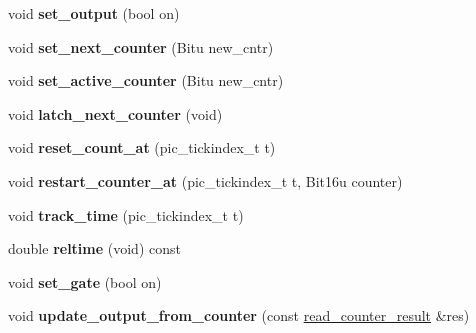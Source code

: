 \begin{DoxyCompactItemize}
\item 
\hypertarget{structPIT__Block_a9ea05717862ad509b30c01e97efc1d6e}{void {\bfseries set\-\_\-output} (bool on)}\label{structPIT__Block_a9ea05717862ad509b30c01e97efc1d6e}

\item 
\hypertarget{structPIT__Block_a4ec9e0b2471d1fe95086780f62f8031c}{void {\bfseries set\-\_\-next\-\_\-counter} (Bitu new\-\_\-cntr)}\label{structPIT__Block_a4ec9e0b2471d1fe95086780f62f8031c}

\item 
\hypertarget{structPIT__Block_adc47a097f48a2a12151b16dc2d1e6628}{void {\bfseries set\-\_\-active\-\_\-counter} (Bitu new\-\_\-cntr)}\label{structPIT__Block_adc47a097f48a2a12151b16dc2d1e6628}

\item 
\hypertarget{structPIT__Block_a56ed17f3c757714e909ba72271aefde1}{void {\bfseries latch\-\_\-next\-\_\-counter} (void)}\label{structPIT__Block_a56ed17f3c757714e909ba72271aefde1}

\item 
\hypertarget{structPIT__Block_a00258cc284377cd9a372a1bd20ddea26}{void {\bfseries reset\-\_\-count\-\_\-at} (pic\-\_\-tickindex\-\_\-t t)}\label{structPIT__Block_a00258cc284377cd9a372a1bd20ddea26}

\item 
\hypertarget{structPIT__Block_af2e30a0ae86ccdbadceac984ffc37873}{void {\bfseries restart\-\_\-counter\-\_\-at} (pic\-\_\-tickindex\-\_\-t t, Bit16u counter)}\label{structPIT__Block_af2e30a0ae86ccdbadceac984ffc37873}

\item 
\hypertarget{structPIT__Block_aa7d415bad4024a431464254c1267a447}{void {\bfseries track\-\_\-time} (pic\-\_\-tickindex\-\_\-t t)}\label{structPIT__Block_aa7d415bad4024a431464254c1267a447}

\item 
\hypertarget{structPIT__Block_ae9a29428e6cc555b4b9de1f4d8256b65}{double {\bfseries reltime} (void) const }\label{structPIT__Block_ae9a29428e6cc555b4b9de1f4d8256b65}

\item 
\hypertarget{structPIT__Block_a2b3d7eb6b7f39c75e7676a5ce8fbf947}{void {\bfseries set\-\_\-gate} (bool on)}\label{structPIT__Block_a2b3d7eb6b7f39c75e7676a5ce8fbf947}

\item 
\hypertarget{structPIT__Block_a421c23b8039bb92b647bdd984bcebf1f}{void {\bfseries update\-\_\-output\-\_\-from\-\_\-counter} (const \hyperlink{structPIT__Block_1_1read__counter__result}{read\-\_\-counter\-\_\-result} \&res)}\label{structPIT__Block_a421c23b8039bb92b647bdd984bcebf1f}


\end{DoxyCompactItemize}
